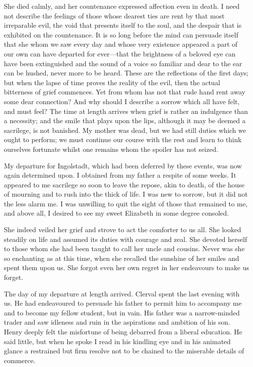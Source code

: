 \documentclass[12pt,openright]{book}
\begin{document}
She died calmly, and her countenance expressed affection even in death. I need not describe the feelings of those whose dearest ties are rent by that most irreparable evil, the void that presents itself to the soul, and the despair that is exhibited on the countenance. It is so long before the mind can persuade itself that she whom we saw every day and whose very existence appeared a part of our own can have departed for ever—that the brightness of a beloved eye can have been extinguished and the sound of a voice so familiar and dear to the ear can be hushed, never more to be heard. These are the reflections of the first days; but when the lapse of time proves the reality of the evil, then the actual bitterness of grief commences. Yet from whom has not that rude hand rent away some dear connection? And why should I describe a sorrow which all have felt, and must feel? The time at length arrives when grief is rather an indulgence than a necessity; and the smile that plays upon the lips, although it may be deemed a sacrilege, is not banished. My mother was dead, but we had still duties which we ought to perform; we must continue our course with the rest and learn to think ourselves fortunate whilst one remains whom the spoiler has not seized.

My departure for Ingolstadt, which had been deferred by these events, was now again determined upon. I obtained from my father a respite of some weeks. It appeared to me sacrilege so soon to leave the repose, akin to death, of the house of mourning and to rush into the thick of life. I was new to sorrow, but it did not the less alarm me. I was unwilling to quit the sight of those that remained to me, and above all, I desired to see my sweet Elizabeth in some degree consoled.

She indeed veiled her grief and strove to act the comforter to us all. She looked steadily on life and assumed its duties with courage and zeal. She devoted herself to those whom she had been taught to call her uncle and cousins. Never was she so enchanting as at this time, when she recalled the sunshine of her smiles and spent them upon us. She forgot even her own regret in her endeavours to make us forget.

The day of my departure at length arrived. Clerval spent the last evening with us. He had endeavoured to persuade his father to permit him to accompany me and to become my fellow student, but in vain. His father was a narrow-minded trader and saw idleness and ruin in the aspirations and ambition of his son. Henry deeply felt the misfortune of being debarred from a liberal education. He said little, but when he spoke I read in his kindling eye and in his animated glance a restrained but firm resolve not to be chained to the miserable details of commerce.
\end{document}

